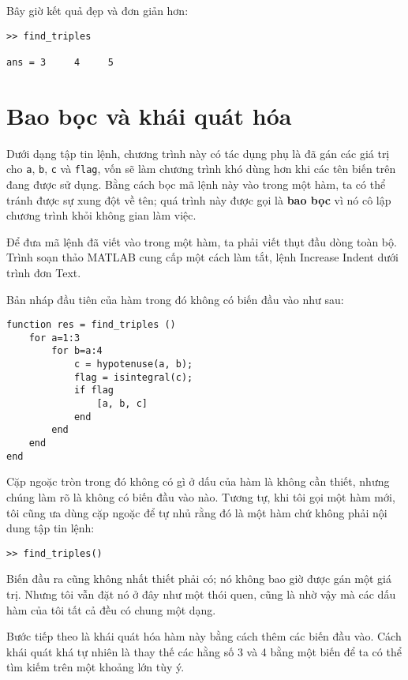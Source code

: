 \documentclass[12pt]{book}
\begin{document}
Bây giờ kết quả đẹp và đơn giản hơn:

\begin{verbatim}
>> find_triples

ans = 3     4     5
\end{verbatim}




\section{Bao bọc và khái quát hóa}

Dưới dạng tập tin lệnh, chương trình này có tác dụng phụ là đã gán các
giá trị cho {\tt a}, {\tt b}, {\tt c} và {\tt flag}, vốn sẽ làm 
chương trình khó dùng hơn khi các tên biến trên đang được sử dụng.
Bằng cách bọc mã lệnh này vào trong một hàm, ta có thể tránh được sự
xung đột về tên; quá trình này được gọi là {\bf bao bọc} vì nó 
cô lập chương trình khỏi không gian làm việc.

Để đưa mã lệnh đã viết vào trong một hàm, ta phải viết thụt đầu 
dòng toàn bộ. Trình soạn thảo MATLAB cung cấp một cách làm tắt,
lệnh {\sf Increase Indent} dưới trình đơn {\sf Text}. 

Bản nháp đầu tiên của hàm trong đó không có biến đầu vào như sau:

\begin{verbatim}
function res = find_triples ()
    for a=1:3
        for b=a:4
            c = hypotenuse(a, b);
            flag = isintegral(c);
            if flag
                [a, b, c]
            end
        end
    end
end
\end{verbatim}

Cặp ngoặc tròn trong đó không có gì ở dấu của hàm là không cần thiết,
nhưng chúng làm rõ là không có biến đầu vào nào. Tương tự, khi tôi gọi
một hàm mới, tôi cũng ưa dùng cặp ngoặc để tự nhủ rằng đó là một hàm
chứ không phải nội dung tập tin lệnh:

\begin{verbatim}
>> find_triples()
\end{verbatim}

Biến đầu ra cũng không nhất thiết phải có; nó không bao giờ được gán
một giá trị. Nhưng tôi vẫn đặt nó ở đây như một thói quen, cũng là
nhờ vậy mà các dấu hàm của tôi tất cả đều có chung một dạng.

Bước tiếp theo là khái quát hóa hàm này bằng cách thêm các biến
đầu vào. Cách khái quát khá tự nhiên là thay thế các hằng số
3 và 4 bằng một biến để ta có thể tìm kiếm trên một khoảng lớn
tùy ý.
\end{document}
